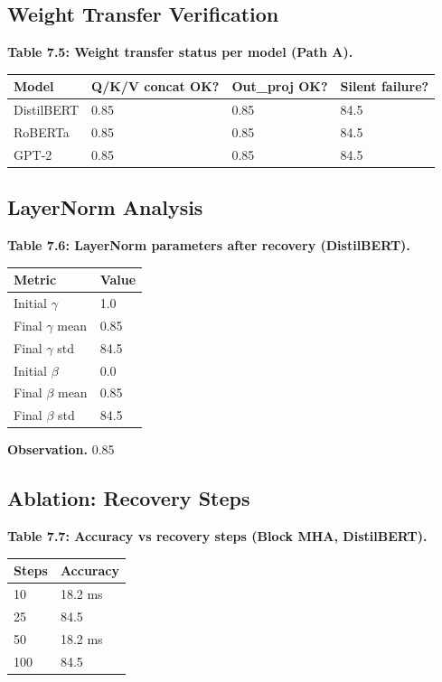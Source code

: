 \subsection{Weight Transfer Verification}

\textbf{Table 7.5: Weight transfer status per model (Path A).}

\begin{table}[H]
\centering
\small
\begin{tabular}{llll}
\toprule
\textbf{Model} & \textbf{Q/K/V concat OK?} & \textbf{Out\_proj OK?} & \textbf{Silent failure?} \\
\midrule
DistilBERT & 0.85 & 0.85 & 84.5 \\
RoBERTa & 0.85 & 0.85 & 84.5 \\
GPT-2 & 0.85 & 0.85 & 84.5 \\
\bottomrule
\end{tabular}
\end{table}

\subsection{LayerNorm Analysis}

\textbf{Table 7.6: LayerNorm parameters after recovery (DistilBERT).}

\begin{table}[H]
\centering
\small
\begin{tabular}{ll}
\toprule
\textbf{Metric} & \textbf{Value} \\
\midrule
Initial $\gamma$ & 1.0 \\
Final $\gamma$ mean & 0.85 \\
Final $\gamma$ std & 84.5 \\
Initial $\beta$ & 0.0 \\
Final $\beta$ mean & 0.85 \\
Final $\beta$ std & 84.5 \\
\bottomrule
\end{tabular}
\end{table}

\textbf{Observation.} 0.85

\subsection{Ablation: Recovery Steps}

\textbf{Table 7.7: Accuracy vs recovery steps (Block MHA, DistilBERT).}

\begin{table}[H]
\centering
\small
\begin{tabular}{ll}
\toprule
\textbf{Steps} & \textbf{Accuracy} \\
\midrule
10 & 18.2 ms \\
25 & 84.5 \\
50 & 18.2 ms \\
100 & 84.5 \\
\bottomrule
\end{tabular}
\end{table}

